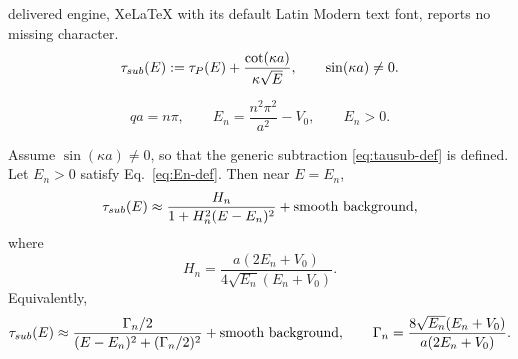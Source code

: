 \documentclass[10pt,a4paper]{amsart}
\begin{document}
delivered engine, XeLaTeX with its default Latin Modern text font, reports no missing character.
\begin{equation}
\tau_{\rm sub}(E):=
\tau_P(E)+\frac{\cot(\kappa a)}{\kappa\sqrt{E}},
\qquad \sin(\kappa a)\neq 0.
\label{eq:tausub-def}
\end{equation}

\begin{equation}
qa=n\pi,
\qquad
E_n=\frac{n^2\pi^2}{a^2}-V_0,
\qquad E_n>0.
\label{eq:En-def}
\end{equation}

\begin{proposition}
Assume \(\sin(\kappa a)\neq0\), so that the generic subtraction
\eqref{eq:tausub-def} is defined. Let \(E_n>0\) satisfy
Eq.~\eqref{eq:En-def}. Then near \(E=E_n\),
\begin{equation}
\tau_{\rm sub}(E)\approx
\frac{H_n}{1+H_n^2(E-E_n)^2}
+\text{smooth background},
\label{eq:tausub-Lorentz}
\end{equation}
where
\begin{equation}
H_n=\frac{a(2E_n+V_0)}{4\sqrt{E_n}(E_n+V_0)}.
\label{eq:Hn-def}
\end{equation}
Equivalently,
\begin{equation}
\tau_{\rm sub}(E)\approx
\frac{\Gamma_n/2}{(E-E_n)^2+(\Gamma_n/2)^2}
+\text{smooth background},
\qquad
\Gamma_n=\frac{8\sqrt{E_n}(E_n+V_0)}{a(2E_n+V_0)}.
\label{eq:Gamma-def}
\end{equation}
\end{proposition}
\end{document}
